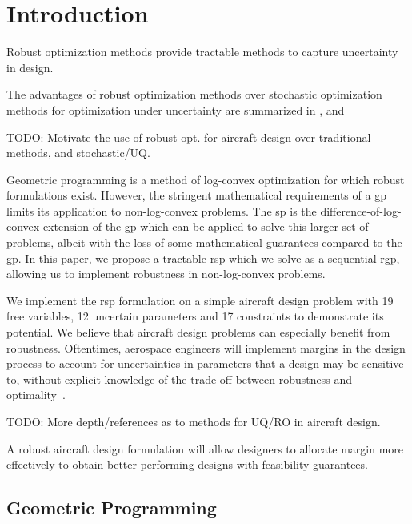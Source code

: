 \section{Introduction}

Robust optimization methods provide tractable methods to capture uncertainty in design.

The advantages of robust optimization methods over stochastic optimization methods
for optimization under uncertainty are summarized in \cite{Bertsimas2011}, 
and 

TODO: Motivate the use of robust opt. for aircraft design over traditional methods, and stochastic/UQ.

Geometric programming is a method of log-convex optimization for which robust formulations exist.
However, the stringent mathematical requirements of a \gls{gp} limits its application to non-log-convex problems.
The \gls{sp} is the difference-of-log-convex extension of the \gls{gp} which can be applied to
solve this larger set of problems, albeit with the loss of some mathematical guarantees compared to the \gls{gp}.
In this paper, we propose a tractable \gls{rsp} which we solve as a sequential \gls{rgp},
allowing us to implement robustness in non-log-convex problems.

We implement the \gls{rsp} formulation on a simple aircraft design problem with 19 free variables,
12 uncertain parameters and 17 constraints to demonstrate its potential. We believe that aircraft design
problems can especially benefit from robustness. Oftentimes, aerospace engineers will implement
margins in the design process to account for uncertainties in parameters that a design may be sensitive to,
without explicit knowledge of the trade-off between robustness and optimality~\cite{yao2011}.

TODO: More depth/references as to methods for UQ/RO in aircraft design.

A robust aircraft design formulation will allow designers to allocate margin more effectively
to obtain better-performing designs with feasibility guarantees.

\subsection{Geometric Programming}

